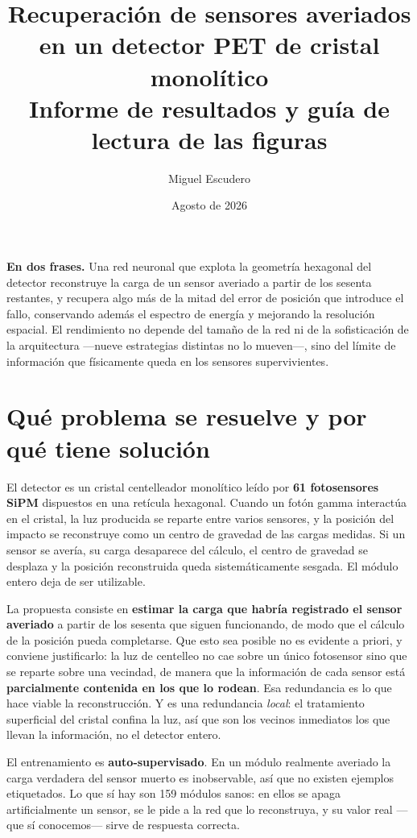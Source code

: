 \documentclass[11pt,a4paper]{article}
\title{\vspace{-1.5cm}\textbf{Recuperación de sensores averiados en un detector PET
de cristal monolítico}\\[0.3cm]
\large Informe de resultados y guía de lectura de las figuras}
\author{Miguel Escudero}
\date{Agosto de 2026}
\begin{document}
\maketitle
\thispagestyle{fancy}

\begin{idea}
\noindent\textbf{En dos frases.} Una red neuronal que explota la geometría hexagonal del
detector reconstruye la carga de un sensor averiado a partir de los sesenta restantes, y
recupera algo más de la mitad del error de posición que introduce el fallo, conservando
además el espectro de energía y mejorando la resolución espacial. El rendimiento no
depende del tamaño de la red ni de la sofisticación de la arquitectura ---nueve estrategias
distintas no lo mueven---, sino del límite de información que físicamente queda en los
sensores supervivientes.
\end{idea}

\section{Qué problema se resuelve y por qué tiene solución}

El detector es un cristal centelleador monolítico leído por \textbf{61 fotosensores SiPM}
dispuestos en una retícula hexagonal. Cuando un fotón gamma interactúa en el cristal, la luz
producida se reparte entre varios sensores, y la posición del impacto se reconstruye como
un centro de gravedad de las cargas medidas. Si un sensor se avería, su carga desaparece del
cálculo, el centro de gravedad se desplaza y la posición reconstruida queda sistemáticamente
sesgada. El módulo entero deja de ser utilizable.

La propuesta consiste en \textbf{estimar la carga que habría registrado el sensor averiado}
a partir de los sesenta que siguen funcionando, de modo que el cálculo de la posición pueda
completarse. Que esto sea posible no es evidente a priori, y conviene justificarlo: la luz
de centelleo no cae sobre un único fotosensor sino que se reparte sobre una vecindad, de
manera que la información de cada sensor está \textbf{parcialmente contenida en los que lo
rodean}. Esa redundancia es lo que hace viable la reconstrucción. Y es una redundancia
\emph{local}: el tratamiento superficial del cristal confina la luz, así que son los vecinos
inmediatos los que llevan la información, no el detector entero.

El entrenamiento es \textbf{auto-supervisado}. En un módulo realmente averiado la carga
verdadera del sensor muerto es inobservable, así que no existen ejemplos etiquetados. Lo que
sí hay son 159 módulos sanos: en ellos se apaga artificialmente un sensor, se le pide a la
red que lo reconstruya, y su valor real ---que sí conocemos--- sirve de respuesta correcta.
\end{document}
